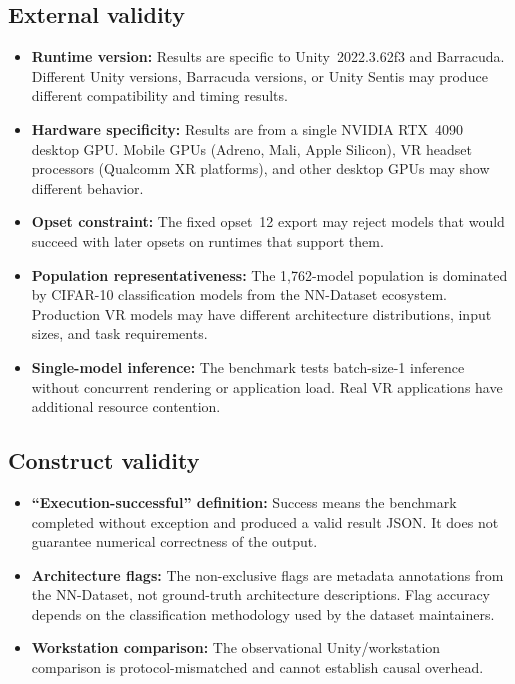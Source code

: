 \documentclass[10pt,twocolumn,letterpaper]{article}
\begin{document}
\subsection{External validity}

\begin{itemize}[nosep,leftmargin=*]
  \item \textbf{Runtime version:} Results are specific to Unity~2022.3.62f3 and Barracuda. Different Unity versions, Barracuda versions, or Unity Sentis may produce different compatibility and timing results.
  \item \textbf{Hardware specificity:} Results are from a single NVIDIA RTX~4090 desktop GPU. Mobile GPUs (Adreno, Mali, Apple Silicon), VR headset processors (Qualcomm XR platforms), and other desktop GPUs may show different behavior.
  \item \textbf{Opset constraint:} The fixed opset~12 export may reject models that would succeed with later opsets on runtimes that support them.
  \item \textbf{Population representativeness:} The 1,762-model population is dominated by CIFAR-10 classification models from the NN-Dataset ecosystem. Production VR models may have different architecture distributions, input sizes, and task requirements.
  \item \textbf{Single-model inference:} The benchmark tests batch-size-1 inference without concurrent rendering or application load. Real VR applications have additional resource contention.
\end{itemize}

\subsection{Construct validity}

\begin{itemize}[nosep,leftmargin=*]
  \item \textbf{``Execution-successful'' definition:} Success means the benchmark completed without exception and produced a valid result JSON. It does not guarantee numerical correctness of the output.
  \item \textbf{Architecture flags:} The non-exclusive flags are metadata annotations from the NN-Dataset, not ground-truth architecture descriptions. Flag accuracy depends on the classification methodology used by the dataset maintainers.
  \item \textbf{Workstation comparison:} The observational Unity/workstation comparison is protocol-mismatched and cannot establish causal overhead.
\end{itemize}
\end{document}
